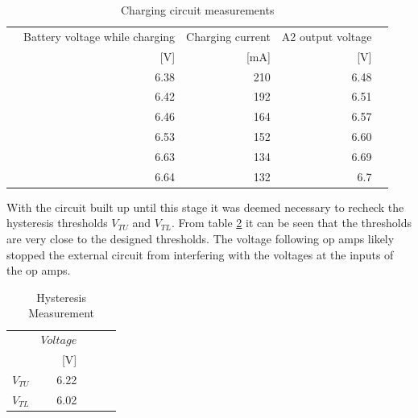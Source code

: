 \begin{table}[!htb]
        \centering
        \footnotesize
        \caption{Charging circuit measurements}
         \begin{tabular}{lrrrr}
          \toprule
            &Battery voltage while charging& Charging current&A2 output voltage \\
             &  [V]&[mA]&[V] \\
          \midrule
           &6.38&210&6.48     \\
           &6.42&192&6.51     \\
           &6.46&164&6.57     \\
           &6.53&152&6.60     \\
           &6.63&134&6.69     \\
           &6.64&132&6.7     \\
           

          \bottomrule
        \end{tabular}
     \label{tab:batsys}
\end{table}


With the circuit built up until this stage it was deemed necessary to recheck the hysteresis thresholds $V_{TU}$ and $V_{TL}$. From table \ref{tab:hyst meas} it can be seen that the thresholds are very close to the designed thresholds. The voltage following op amps likely stopped the external circuit from interfering with the voltages at the inputs of the op amps. 
\begin{table}[!htb]
        \centering
        \footnotesize
        \caption{Hysteresis Measurement}
         \begin{tabular}{lrrrr}
          \toprule
             & $Voltage$ \\
             &  [V] \\
          \midrule
         $V_{TU}$      & 6.22  \\
         $V_{TL}$     & 6.02\\
       
          \bottomrule
        \end{tabular}
     \label{tab:hyst meas}
\end{table}



